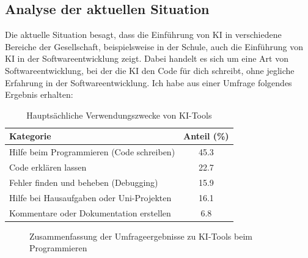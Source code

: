 \documentclass[paper=a4,fontsize=12pt,ngerman]{scrartcl}
\begin{document}
\subsection{Analyse der aktuellen Situation}
Die aktuelle Situation besagt, dass die Einführung von KI in verschiedene Bereiche der Gesellschaft, 
beispielsweise in der Schule, auch die Einführung von KI in der Softwareentwicklung zeigt. 
Dabei handelt es sich um eine Art von Softwareentwicklung, bei der die KI den Code für dich schreibt,
ohne jegliche Erfahrung in der Softwareentwicklung. Ich habe aus einer Umfrage folgendes Ergebnis erhalten: 

\begin{table}[ht]
    \centering
    \caption{Hauptsächliche Verwendungszwecke von KI-Tools}
    \begin{tabular}{l S[table-format=2.1]}
    \toprule
    \textbf{Kategorie} & \textbf{Anteil (\%)} \\
    \midrule
    Hilfe beim Programmieren (Code schreiben) & 45.3 \\
    Code erklären lassen & 22.7 \\
    Fehler finden und beheben (Debugging) & 15.9 \\
    Hilfe bei Hausaufgaben oder Uni-Projekten & 16.1 \\
    Kommentare oder Dokumentation erstellen & 6.8 \\
    \bottomrule
    \end{tabular}
\end{table}

\begin{figure}[h]
\centering
{}
\caption{Zusammenfassung der Umfrageergebnisse zu KI-Tools beim Programmieren}
\end{figure}
\end{document}
